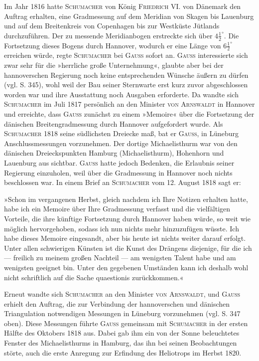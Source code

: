 \par\noindent\hspace*{\parindent}Im Jahr 1816 hatte \textsc{Schumacher} von König \textsc{Friedrich} VI. von Dänemark den Auftrag erhalten, eine Gradmessung auf dem Meridian von Skagen bis Lauenburg und auf dem Breitenkreis von Copenhagen bis zur Westküste Jütlands durchzuführen. Der zu messende Meridianbogen erstreckte sich über $4\frac12^\circ$. Die Fortsetzung dieses Bogens durch Hannover, wodurch er eine Länge von $6\frac12^\circ$ erreichen würde, regte \textsc{Schumacher} bei \textsc{Gauss} sofort an. \textsc{Gauss} interessierte sich zwar sehr für die »herrliche große Unternehmung«, glaubte aber bei der hannoverschen Regierung noch keine entsprechenden Wünsche äußern zu dürfen (vgl. S. 345), wohl weil der Bau seiner Sternwarte erst kurz zuvor abgeschlossen worden war und ihre Ausstattung noch Ausgaben erforderte. Da wandte sich \textsc{Schumacher} im Juli 1817 persönlich an den Minister \textsc{von Arnswaldt} in Hannover und erreichte, dass \textsc{Gauss} zunächst zu einem »Memoire« über die Fortsetzung der dänischen Breitengradmessung durch Hannover aufgefordert wurde. Als \textsc{Schumacher} 1818 seine südlichsten Dreiecke maß, bat er \textsc{Gauss}, in Lüneburg Anschlussmessungen vorzunehmen. Der dortige Michaelisthurm war von den dänischen Dreieckspunkten Hamburg (Michaelisthurm), Hohenhorn und Lauenburg aus sichtbar. \textsc{Gauss} hatte jedoch Bedenken, die Erlaubnis seiner Regierung einzuholen, weil über die Gradmessung in Hannover noch nichts beschlossen war. In einem Brief an \textsc{Schumacher} vom 12. August 1818 sagt er:

\par\noindent\hspace*{\parindent}»Schon im vergangenen Herbst, gleich nachdem ich Ihre Notizen erhalten hatte, habe ich ein Memoire über Ihre Gradmessung verfasst und die vielfältigen Vorteile, die ihre künftige Fortsetzung durch Hannover haben würde, so weit wie möglich hervorgehoben, sodass ich nun nichts mehr hinzuzufügen wüsste. Ich habe dieses Memoire eingesandt, aber bis heute ist nichts weiter darauf erfolgt. Unter allen schwierigen Künsten ist die Kunst des Drängens diejenige, für die ich --- freilich zu meinem großen Nachteil --- am wenigsten Talent habe und am wenigsten geeignet bin. Unter den gegebenen Umständen kann ich deshalb wohl nicht schriftlich auf die Sache quaestionis zurückkommen.«

\par\noindent\hspace*{\parindent}Erneut wandte sich \textsc{Schumacher} an den Minister \textsc{von Arnswaldt}, und \textsc{Gauss} erhielt den Auftrag, die zur Verbindung der hannoverschen und dänischen Triangulation notwendigen Messungen in Lüneburg vorzunehmen (vgl. S. 347 oben). Diese Messungen führte \textsc{Gauss} gemeinsam mit \textsc{Schumacher} in der ersten Hälfte des Oktobers 1818 aus. Dabei gab ihm ein von der Sonne beleuchtetes Fenster des Michaelisthurms in Hamburg, das ihn bei seinen Beobachtungen störte, auch die erste Anregung zur Erfindung des Heliotrops im Herbst 1820.

